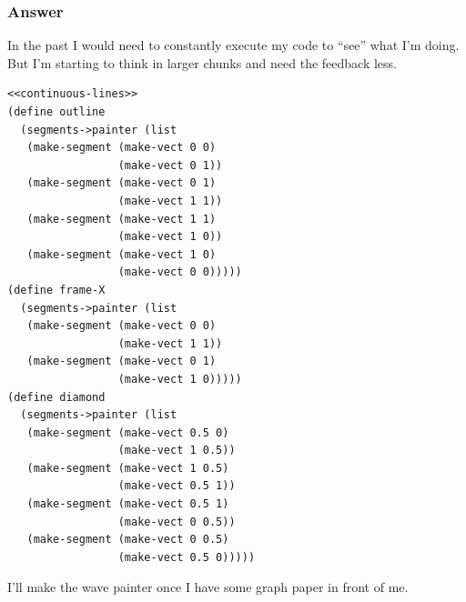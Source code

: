 \documentclass[final,fleqn,titlepage,twoside]{article}
\begin{document}
\subsubsection{Answer}
\label{sec:org31df6d9}
In the past I would need to constantly execute my code to ``see'' what I'm doing.
But I'm starting to think in larger chunks and need the feedback less.


\begin{verbatim}
<<continuous-lines>>
(define outline
  (segments->painter (list
   (make-segment (make-vect 0 0)
                 (make-vect 0 1))
   (make-segment (make-vect 0 1)
                 (make-vect 1 1))
   (make-segment (make-vect 1 1)
                 (make-vect 1 0))
   (make-segment (make-vect 1 0)
                 (make-vect 0 0)))))
(define frame-X
  (segments->painter (list
   (make-segment (make-vect 0 0)
                 (make-vect 1 1))
   (make-segment (make-vect 0 1)
                 (make-vect 1 0)))))
(define diamond
  (segments->painter (list
   (make-segment (make-vect 0.5 0)
                 (make-vect 1 0.5))
   (make-segment (make-vect 1 0.5)
                 (make-vect 0.5 1))
   (make-segment (make-vect 0.5 1)
                 (make-vect 0 0.5))
   (make-segment (make-vect 0 0.5)
                 (make-vect 0.5 0)))))
\end{verbatim}

I'll make the wave painter once I have some graph paper in front of me.
\end{document}
